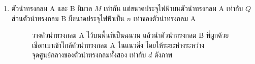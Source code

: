 \documentclass[a4paper, 12pt]{article}
\begin{document}
\begin{enumerate}
\begin{figure}[H]
          \end{figure}
          ถ้าต้องการให้ลวดหลุดออกจากผิวของของเหลวได้ จะต้องออกแรงดึงขนาดอย่างน้อยกี่นิวตัน
          \begin{enumerate}
              \item \num{3.9e-2}
              \item \num{4.9e-2}
              \item \num{5.9e-2}
              \item \num{7.8e-2}
              \item \num{9.8e-2}
          \end{enumerate}
          \newpage
    \item ตัวนำทรงกลม A และ B มีมวล \(M\) เท่ากัน แต่ขนาดประจุไฟฟ้าบนตัวนำทรงกลม A เท่ากับ \(Q\) ส่วนตัวนำทรงกลม B มีขนาดประจุไฟฟ้าเป็น \(n\) เท่าของตัวนำทรงกลม A \\
          \begin{figure}[H]
              \begin{minipage}[ht]{0.45\linewidth}
                  วางตัวนำทรงกลม A ไว้บนพื้นที่เป็นฉนวน แล้วนำตัวนำทรงกลม B ที่ผูกด้วยเชือกเบาเข้าใกล้ตัวนำทรงกลม A ในแนวดิ่ง โดยให้ระยะห่างระหว่างจุดศูนย์กลางของตัวนำทรงกลมทั้งสอง เท่ากับ \(d\) ดังภาพ \\


\end{minipage}
\end{figure}
\end{enumerate}
\end{document}
